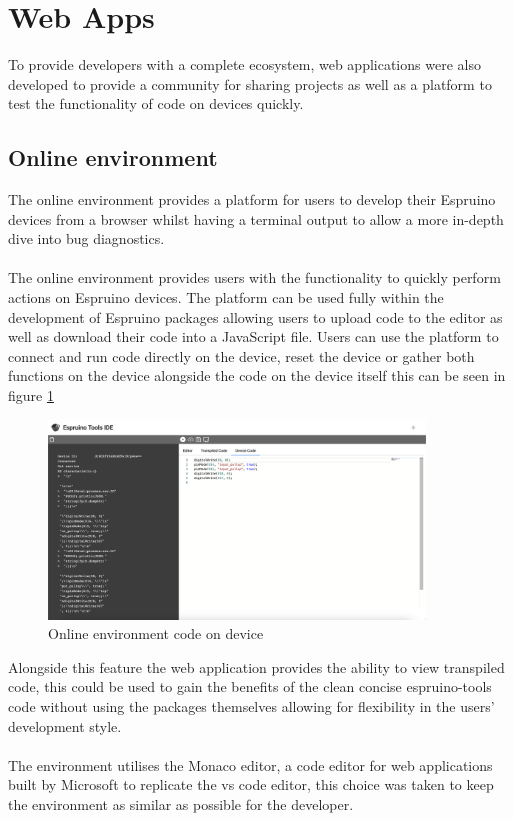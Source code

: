 \documentclass{l4proj}
\begin{document}
\section{Web Apps}
To provide developers with a complete ecosystem, web applications were also developed to provide a community for sharing projects as well as a platform to test the functionality of code on devices quickly.

\subsection{Online environment}
The online environment provides a platform for users to develop their Espruino devices from a browser whilst having a terminal output to allow a more in-depth dive into bug diagnostics.
\\ \\
The online environment provides users with the functionality to quickly perform actions on Espruino devices. The platform can be used fully within the development of Espruino packages allowing users to upload code to the editor as well as download their code into a JavaScript file. Users can use the platform to connect and run code directly on the device, reset the device or gather both functions on the device alongside the code on the device itself this can be seen in figure \ref{fig:online-env-device-code}

\begin{figure}[!ht]
    \centering
    \includegraphics[width=10cm]{dissertation/images/online-env-device-code.png}
    \caption{Online environment code on device}
    \label{fig:online-env-device-code}
\end{figure}

Alongside this feature the web application provides the ability to view transpiled code, this could be used to gain the benefits of the clean concise espruino-tools code without using the packages themselves allowing for flexibility in the users' development style.
\\ \\
The environment utilises the Monaco editor, a code editor for web applications built by Microsoft to replicate the vs code editor, this choice was taken to keep the environment as similar as possible for the developer.
\end{document}
